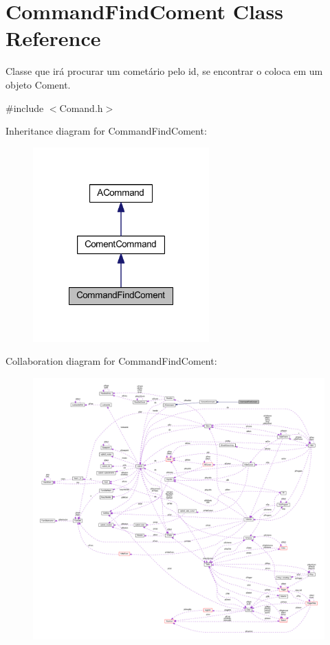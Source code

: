 \hypertarget{class_command_find_coment}{\section{Command\-Find\-Coment Class Reference}
\label{class_command_find_coment}
}


Classe que irá procurar um cometário pelo id, se encontrar o coloca em um objeto Coment.  




{\ttfamily \#include $<$Comand.\-h$>$}



Inheritance diagram for Command\-Find\-Coment\-:\nopagebreak
\begin{figure}[H]
\begin{center}
\leavevmode
\includegraphics[width=192pt]{class_command_find_coment__inherit__graph}
\end{center}
\end{figure}


Collaboration diagram for Command\-Find\-Coment\-:\nopagebreak
\begin{figure}[H]
\begin{center}
\leavevmode
\includegraphics[width=350pt]{class_command_find_coment__coll__graph}
\end{center}
\end{figure}
